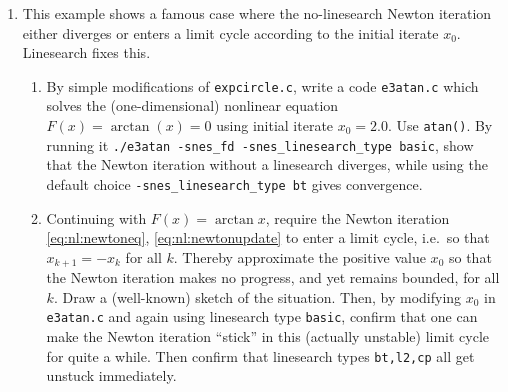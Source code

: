 \begin{enumerate}
\item  \label{exer:newtonatan}
This example shows a famous case where the no-linesearch Newton iteration either diverges or enters a limit cycle according to the initial iterate $x_0$.  Linesearch fixes this.
    \begin{enumerate}
    \item By simple modifications of \texttt{expcircle.c}, write a code \texttt{e3atan.c} which solves the (one-dimensional) nonlinear equation $F(x)=\arctan(x)=0$ using initial iterate $x_0=2.0$.  Use \texttt{atan()}.  By running it \texttt{./e3atan -snes\_fd -snes\_linesearch\_type basic}, show that the Newton iteration without a linesearch diverges, while using the default choice \texttt{-snes\_linesearch\_type bt} gives convergence.
    \item Continuing with $F(x)=\arctan x$, require the Newton iteration \eqref{eq:nl:newtoneq}, \eqref{eq:nl:newtonupdate} to enter a limit cycle, i.e.~so that $x_{k+1} = - x_k$ for all $k$.  Thereby approximate the positive value $x_0$ so that the Newton iteration makes no progress, and yet remains bounded, for all $k$.  Draw a (well-known) sketch of the situation.  Then, by modifying $x_0$ in \texttt{e3atan.c} and again using linesearch type \texttt{basic}, confirm that one can make the Newton iteration ``stick'' in this (actually unstable) limit cycle for quite a while.  Then confirm that linesearch types \texttt{bt,l2,cp} all get unstuck immediately.
    \end{enumerate}

\end{enumerate}